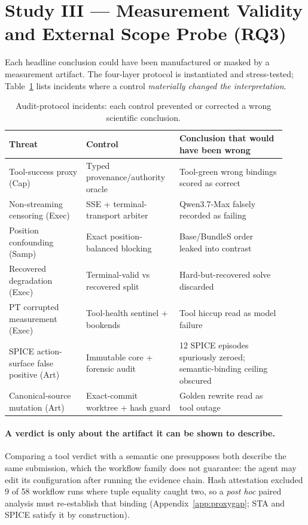 \documentclass{article}
\begin{document}
\section{Study III --- Measurement Validity and External Scope Probe (RQ3)}
\label{sec:custody}
Each headline conclusion could have been manufactured or masked by a measurement artifact. The four-layer protocol is instantiated and stress-tested; Table~\ref{tab:incidents} lists incidents where a control \emph{materially changed the interpretation}.

\begin{table}[h]
\centering\scriptsize
\setlength{\tabcolsep}{4pt}
\caption{Audit-protocol incidents: each control prevented or corrected a wrong scientific conclusion.}
\label{tab:incidents}
\begin{tabular}{p{0.26\linewidth} p{0.30\linewidth} p{0.36\linewidth}}
\toprule
Threat & Control & Conclusion that would have been wrong \\
\midrule
Tool-success proxy (Cap) & Typed provenance/authority oracle & Tool-green wrong bindings scored as correct \\
Non-streaming censoring (Exec) & SSE + terminal-transport arbiter & Qwen3.7-Max falsely recorded as failing \\
Position confounding (Samp) & Exact position-balanced blocking & Base/BundleS order leaked into contrast \\
Recovered degradation (Exec) & Terminal-valid vs recovered split & Hard-but-recovered solve discarded \\
PT corrupted measurement (Exec) & Tool-health sentinel + bookends & Tool hiccup read as model failure \\
SPICE action-surface false positive (Art) & Immutable core + forensic audit & 12 SPICE episodes spuriously zeroed; semantic-binding ceiling obscured \\
Canonical-source mutation (Art) & Exact-commit worktree + hash guard & Golden rewrite read as tool outage \\
\bottomrule
\end{tabular}
\end{table}

\paragraph{A verdict is only about the artifact it can be shown to describe.} Comparing a tool verdict with a semantic one presupposes both describe the same submission, which the workflow family does not guarantee: the agent may edit its configuration after running the evidence chain. Hash attestation excluded 9 of 58 workflow runs where tuple equality caught two, so a \emph{post hoc} paired analysis must re-establish that binding (Appendix~\ref{app:proxygap}; STA and SPICE satisfy it by construction).
\end{document}
